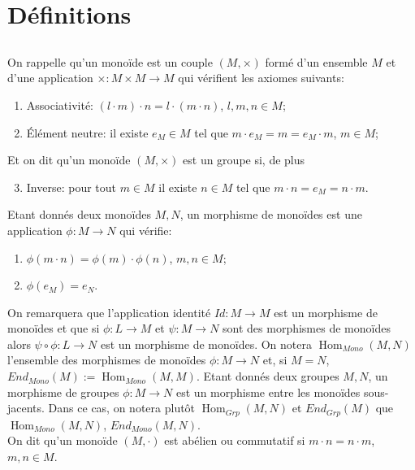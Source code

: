 \documentclass[a4paper, oneside, 12pt]{book}
\theoremstyle{theoremeStyle} %
\theoremstyle{definition} %
\DeclareMathOperator{\SHom}{Hom}
\begin{document}
\section{Définitions}
\subsection{}On rappelle qu'un monoïde  est un couple $(M,\times)$ formé d'un ensemble $M$ et d'une application $\times:M\times M\rightarrow M$ qui vérifient les axiomes suivants:
\begin{enumerate}
\item Associativité: $(l\cdot m)\cdot n=l\cdot (m\cdot n)$, $l,m,n\in M$;
\item Élément neutre: il existe $e_M\in M$ tel que $m\cdot e_M=m=e_M\cdot m$, $m\in M$;
\end{enumerate}
 Et on dit qu'un monoïde    $(M,\times)$ est un groupe si, de plus
\begin{enumerate}
\setcounter{enumi}{2}
\item Inverse: pour tout $m\in M$ il existe $n\in M$ tel  que $m\cdot n=e_M=n\cdot m$.\\
\end{enumerate}
 Etant donnés deux monoïdes $M,N$, un morphisme de monoïdes est une application $\phi:M\rightarrow N$   qui vérifie:
\begin{enumerate}
\item $\phi(m\cdot n)=\phi(m)\cdot\phi(n)$, $m,n\in M$;
\item $\phi(e_M )=e_N$.
\end{enumerate}
On remarquera que l'application identité $Id:M\rightarrow M$ est un morphisme de monoïdes et que si $\phi:L\rightarrow M$ et $\psi:M\rightarrow N$ sont des morphismes de monoïdes alors $\psi\circ \phi:L\rightarrow N$ est un morphisme de monoïdes. On notera $\SHom_{Mono}(M,N)$ l'ensemble des morphismes de monoïdes $\phi:M\rightarrow N$ et, si $M=N$, $End_{Mono}(M):=\SHom_{Mono}(M,M)$.  Etant donnés deux groupes $M,N$, un morphisme de groupes $\phi:M\rightarrow N$ est un morphisme entre les monoïdes sous-jacents. Dans ce cas, on notera plutôt $\SHom_{Grp}(M,N)$ et $End_{Grp}(M)$ que $\SHom_{Mono}(M,N)$, $End_{Mono}(M,N)$. \\

 On dit qu'un monoïde $(M,\cdot)$ est abélien ou commutatif si $m\cdot n=n\cdot m$, $m,n\in M$.
\end{document}
